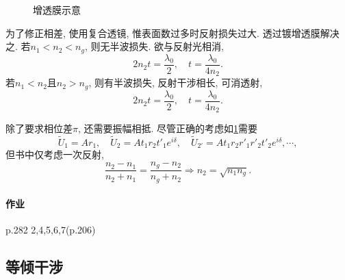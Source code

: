 \documentclass{ctexart}
\begin{document}
\begin{figure}[ht]
    \centering
    \caption{增透膜示意}
\end{figure}
为了修正相差, 使用复合透镜, 惟表面数过多时反射损失过大. 透过镀增透膜解决之. 若$n_1<n_2<n_g$, 则无半波损失. 欲与反射光相消,
\[ 2n_2 t = \frac{\lambda_0}{2},\quad  t = \frac{\lambda_0}{4n_2}. \]
若$n_1<n_2$且$n_2>n_g$, 则有半波损失, 反射干涉相长, 可消透射,
\[ 2n_2 t = \frac{\lambda_0}{2},\quad t = \frac{\lambda_0}{4n_2}. \]
\begin{figure}[ht]
    \centering
    \caption{}
    \label{fig:考虑全部透射反射}
\end{figure}
除了要求相位差$\pi$, 还需要振幅相抵. 尽管正确的考虑如\cref{fig:考虑全部透射反射}需要
\[ \tilde{U}_1 = Ar_1, \quad \tilde{U}_2 = At_1r_2t'_1 e^{i\delta},\quad \tilde{U}_{2'} = At_1r_2r'_1r'_2t'_2 e^{i\delta}, \cdots, \]
但书中仅考虑一次反射,
\[ \frac{n_2-n_1}{n_2+n_1} = \frac{n_g-n_2}{n_g+n_2}\Rightarrow n_2 = \sqrt{n_1n_g}. \]



\paragraph{作业} %
\label{par:作业}

p.282 2,4,5,6,7(p.206)


\subsection{等倾干涉} %
\label{sub:等倾干涉}
\end{document}
